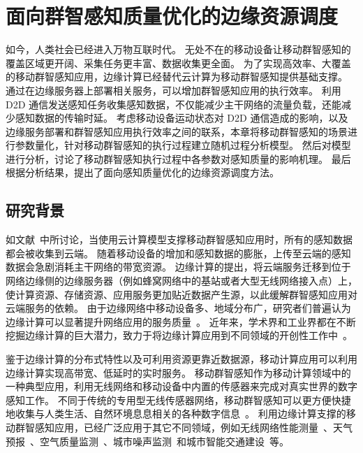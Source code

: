 

\chapter{面向群智感知质量优化的边缘资源调度}

如今，人类社会已经进入万物互联时代。
无处不在的移动设备让移动群智感知的覆盖区域更开阔、采集任务更丰富、数据收集更全面。
为了实现高效率、大覆盖的移动群智感知应用，边缘计算已经替代云计算为移动群智感知提供基础支撑。
通过在边缘服务器上部署相关服务，可以增加群智感知应用的执行效率。
利用 D2D 通信发送感知任务收集感知数据，不仅能减少主干网络的流量负载，还能减少感知数据的传输时延。
考虑移动设备运动状态对 D2D 通信造成的影响，以及边缘服务部署和群智感知应用执行效率之间的联系，本章将移动群智感知的场景进行参数量化，针对移动群智感知的执行过程建立随机过程分析模型。
然后对模型进行分析，讨论了移动群智感知执行过程中各参数对感知质量的影响机理。
最后根据分析结果，提出了面向感知质量优化的边缘资源调度方法。

\section{研究背景}

如文献~中所讨论，当使用云计算模型支撑移动群智感知应用时，所有的感知数据都会被收集到云端。
随着移动设备的增加和感知数据的膨胀，上传至云端的感知数据会急剧消耗主干网络的带宽资源。
边缘计算的提出，将云端服务迁移到位于网络边缘侧的边缘服务器（例如蜂窝网络中的基站或者大型无线网络接入点）上，使计算资源、存储资源、应用服务更加贴近数据产生源，以此缓解群智感知应用对云端服务的依赖。
由于边缘网络中移动设备多、地域分布广，研究者们普遍认为边缘计算可以显著提升网络应用的服务质量~\cite{DBLP:conf/sigcomm/BonomiMZA12}。
近年来，学术界和工业界都在不断挖掘边缘计算的巨大潜力，致力于将边缘计算应用到不同领域的开创性工作中~\cite{DBLP:journals/access/MarjanovicAZ18,DBLP:journals/iotj/ChiangZ16}。


鉴于边缘计算的分布式特性以及可利用资源更靠近数据源，移动计算应用可以利用边缘计算实现高带宽、低延时的实时服务。
移动群智感知作为移动计算领域中的一种典型应用，利用无线网络和移动设备中内置的传感器来完成对真实世界的数字感知工作。
不同于传统的专用型无线传感器网络，移动群智感知可以更方便快捷地收集与人类生活、自然环境息息相关的各种数字信息~\cite{DBLP:journals/cm/GuoCZYC16}。
利用边缘计算支撑的移动群智感知应用，已经广泛应用于其它不同领域，例如无线网络性能测量~\cite{DBLP:journals/cm/RosenLLCMB14}、天气预报~\cite{DBLP:journals/tpds/ZhaoMTL15}、空气质量监测~\cite{DBLP:conf/huc/ZhangXWC14}、城市噪声监测~\cite{DBLP:conf/huc/ZhengLWZLC14}和城市智能交通建设~\cite{DBLP:conf/icdcs/ZhouJL15}等。

